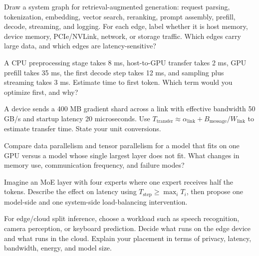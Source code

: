 \begin{exercises}
\item Draw a system graph for retrieval-augmented generation: request parsing, tokenization, embedding, vector search, reranking, prompt assembly, prefill, decode, streaming, and logging. For each edge, label whether it is host memory, device memory, PCIe/NVLink, network, or storage traffic. Which edges carry large data, and which edges are latency-sensitive?
\item A CPU preprocessing stage takes 8 ms, host-to-GPU transfer takes 2 ms, GPU prefill takes 35 ms, the first decode step takes 12 ms, and sampling plus streaming takes 3 ms. Estimate time to first token. Which term would you optimize first, and why?
\item A device sends a 400 MB gradient shard across a link with effective bandwidth 50 GB/s and startup latency 20 microseconds. Use \(T_{\text{transfer}} \approx \alpha_{\text{link}} + B_{\text{message}}/W_{\text{link}}\) to estimate transfer time. State your unit conversions.
\item Compare data parallelism and tensor parallelism for a model that fits on one GPU versus a model whose single largest layer does not fit. What changes in memory use, communication frequency, and failure modes?
\item Imagine an MoE layer with four experts where one expert receives half the tokens. Describe the effect on latency using \(T_{\text{step}} \geq \max_i T_i\), then propose one model-side and one system-side load-balancing intervention.
\item For edge/cloud split inference, choose a workload such as speech recognition, camera perception, or keyboard prediction. Decide what runs on the edge device and what runs in the cloud. Explain your placement in terms of privacy, latency, bandwidth, energy, and model size.
\end{exercises}
